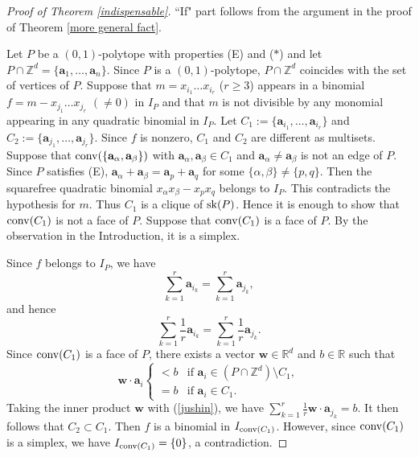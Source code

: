 \documentclass[12pt]{amsart}
\theoremstyle{definition}
\numberwithin{thm}{section}
\numberwithin{equation}{section}
\def\NZQ{\mathbb}               %
\def\ZZ{{\NZQ Z}}
\def\RR{{\NZQ R}}
\def\ab{{\mathbf a}}
\def\wb{{\mathbf w}}
\begin{document}
\begin{proof}[Proof of Theorem \ref{indispensable}]
``If" part follows from the argument in the proof of Theorem \ref{more general fact}.

Let $P$ be a $(0,1)$-polytope with properties (E) and ($*$)
and let $P \cap \ZZ^d = \{\ab_1,\dots,\ab_n\}$.
Since $P$ is a $(0,1)$-polytope, $P \cap \ZZ^d$ coincides with the set of vertices of $P$.
    Suppose that $m=x_{i_1} \dots x_{i_r}$ ($r \ge 3$) appears in a 
    binomial $f=m -x_{j_1} \dots x_{j_r}$
    $(\ne 0)$ in $I_P$ and that 
    $m$ is not divisible by any monomial appearing in any quadratic binomial in $I_P$.
    Let $C_1:=\{\ab_{i_1}, \dots, \ab_{i_r}\}$ and $C_2:=\{\ab_{j_1}, \dots, \ab_{j_r}\}$.
Since $f$ is nonzero, $C_1$ and $C_2$
    are different as multisets.   
Suppose that ${\rm conv}(\{\ab_\alpha, \ab_\beta\})$ with $\ab_\alpha, \ab_\beta \in C_1$
and $\ab_\alpha \ne \ab_\beta$
is not an edge of $P$.
Since $P$ satisfies (E),
$\ab_\alpha+\ab_\beta = \ab_p + \ab_q$
for some $\{\alpha, \beta\} \ne \{p,q\}$.
Then 
the squarefree quadratic binomial
$x_\alpha x_\beta - x_p x_q$ belongs to $I_P$.
This contradicts the hypothesis for $m$.
Thus $C_1$ is a clique of ${\rm sk}(P)$.
Hence it is enough to show that  
${\rm conv}(C_1)$ is not a face of $P$.
Suppose that ${\rm conv}(C_1)$ is a face of $P$.
By the observation in the Introduction, it is a simplex.
    
    Since $f$ belongs to $I_P$, we have 
    \[\sum_{k=1}^r \ab_{i_k} = \sum_{k=1}^r \ab_{j_k},\]
    and hence 
\begin{equation}\label{jushin}
\sum_{k=1}^r \frac{1}{r} \ab_{i_k} = \sum_{k=1}^r \frac{1}{r} \ab_{j_k}.
\end{equation}
Since ${\rm conv}(C_1)$ is a face of $P$,
there exists a vector $\wb \in \RR^d$ and $b \in \RR$ such that
\[
\wb \cdot \ab_i 
\begin{cases}
< b &  \mbox{if } \ab_i \in (P\cap \ZZ^d ) \setminus C_1,\\
= b & \mbox{if } \ab_i \in C_1.
\end{cases}
\]
Taking the inner product $\wb$ with (\ref{jushin}),
we have 
$\sum_{k=1}^r \frac{1}{r} \wb \cdot \ab_{j_k} = b$.
It then follows that $C_2 \subset C_1$. 
Then $f$ is a binomial in $I_{{\rm conv}(C_1)}$.
However, since ${\rm conv}(C_1)$ is a simplex, we have 
$I_{{\rm conv}(C_1)}= \{0\}$, a contradiction.
\end{proof}
\end{document}
